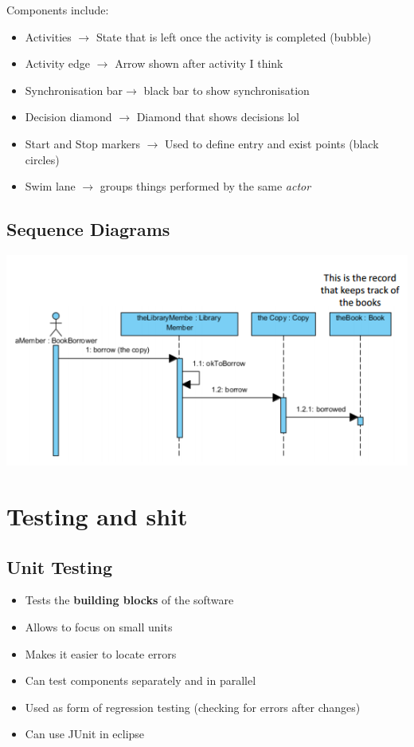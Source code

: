 \documentclass{article}
\begin{document}
Components include:
\begin{itemize}
    \item Activities $\longrightarrow$ State that is left once the activity is completed (bubble)
    \item Activity edge $\longrightarrow$ Arrow shown after activity I think
    \item Synchronisation bar$\longrightarrow$ black bar to show synchronisation
    \item Decision diamond $\longrightarrow$ Diamond that shows decisions lol
    \item Start and Stop markers $\longrightarrow$ Used to define entry and exist points (black circles)
    \item Swim lane $\longrightarrow$ groups things performed by the same \emph{actor}
\end{itemize}

\subsection{Sequence Diagrams}
\includegraphics{sequenceDiagram.png}

\section{Testing and shit}
\subsection{Unit Testing}

\begin{itemize}
    \item Tests the \textbf{building blocks} of the software
    \item Allows to focus on small units
    \item Makes it easier to locate errors
    \item Can test components separately and in parallel
    \item Used as form of regression testing (checking for errors after changes)
    \item Can use JUnit in eclipse
\end{itemize}
\end{document}
